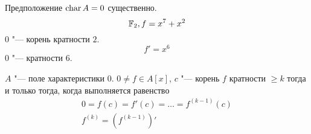 \begin{Rem}
Предположение $\operatorname{char} A = 0$ существенно. 
\[ \mathbb{F}_2, f = x^7 + x^2 \]
$0$ "--- корень кратности $2$.
\[ f' = x^6 \]
$0$ "--- кратности $6$.
\end{Rem}
              
\begin{conseq}
$A$ "--- поле характеристики $0$. $0 \ne f \in A[x]$, $c$ "--- корень $f$ кратности $\ge k$ тогда и только тогда, когда выполняется равенство 
\begin{gather*}
0 = f(c) = f'(c) = \ldots = f^{(k - 1)}(c) \\
f^{(k)} = (f^{(k - 1)})'
\end{gather*}
\end{conseq}